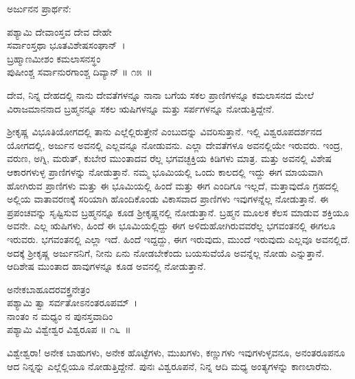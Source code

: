 ಅರ್ಜುನನ ಪ್ರಾರ್ಥನೆ:

\begin{shloka}
ಪಶ್ಯಾಮಿ ದೇವಾಂಸ್ತವ ದೇವ ದೇಹೇ\\ ಸರ್ವಾಂಸ್ತಥಾ ಭೂತವಿಶೇಷಸಂಘಾನ್~।\\ಬ್ರಹ್ಮಾಣಮೀಶಂ ಕಮಲಾಸನಸ್ಥಂ\\ ಪುಷೀಂಶ್ಚ ಸರ್ವಾನುರಗಾಂಶ್ಚ ದಿವ್ಯಾನ್ \hfill॥ ೧೫~॥
\end{shloka}

\newpage

\begin{artha}
ದೇವ, ನಿನ್ನ ದೇಹದಲ್ಲಿ ನಾನು ದೇವತೆಗಳನ್ನೂ ನಾನಾ ಬಗೆಯ ಸಕಲ ಪ್ರಾಣಿಗಳನ್ನೂ ಕಮಲಾಸನದ ಮೇಲೆ ವಿರಾಜಮಾನನಾದ ಬ್ರಹ್ಮನನ್ನೂ ಸಕಲ ಋಷಿಗಳನ್ನೂ ಮತ್ತು ಸರ್ಪಗಳನ್ನೂ ನೋಡುತ್ತಿದ್ದೇನೆ.
\end{artha}

ಶ‍್ರೀಕೃಷ್ಣ ವಿಭೂತಿಯೋಗದಲ್ಲಿ ತಾನು ಎಲ್ಲೆಲ್ಲಿರುತ್ತೇನೆ ಎಂಬುದನ್ನು ವಿವರಿಸುತ್ತಾನೆ. ಇಲ್ಲಿ ವಿಶ್ವರೂಪದರ್ಶನದ ಯೋಗದಲ್ಲಿ, ಅರ್ಜುನ ಅವನಲ್ಲಿ ಎಲ್ಲವನ್ನೂ ನೋಡುವನು. ಎಲ್ಲಾ ದೇವತೆಗಳೂ ಅವನಲ್ಲಿಯೇ ಇರುವರು. ಇಂದ್ರ, ವರುಣ, ಅಗ್ನಿ, ಮರುತ್, ಕುಬೇರ ಮುಂತಾದವ ರೆಲ್ಲ ಭಗವಚ್ಛಕ್ತಿಯ ಕಿಡಿಗಳು ಮಾತ್ರ. ಮತ್ತು ಅವನಲ್ಲಿ ವಿಶೇಷ ಆಕಾರಗಳುಳ್ಳ ಪ್ರಾಣಿಗಳನ್ನು ನೋಡುತ್ತಾನೆ. ನಮ್ಮ ಭೂಮಿಯಲ್ಲಿ ಒಂದು ಕಾಲದಲ್ಲಿ ಇದ್ದು ಈಗ ಮಾಯವಾಗಿ ಹೋಗಿರುವ ಪ್ರಾಣಿಗಳು ಮತ್ತು ಈ ಭೂಮಿಯಲ್ಲಿ ಹಿಂದೆ ಮತ್ತು ಈಗ ಎಂದಿಗೂ ಇಲ್ಲದೆ, ಮತ್ತಾವುದೊ ಗ್ರಹದಲ್ಲಿ ಅಲ್ಲಿಯ ವಾತಾವರಣಕ್ಕೆ ಸರಿಯಾಗಿ ಹೊಂದಿಕೊಂಡು ವಿಕಾಸವಾದ ಪ್ರಾಣಿಗಳು ಇವುಗಳನ್ನೆಲ್ಲ ನೋಡುತ್ತಾನೆ. ಈ ಪ್ರಪಂಚವನ್ನು ಸೃಷ್ಟಿಸುವ ಬ್ರಹ್ಮನನ್ನೂ ಕೂಡ ಶ‍್ರೀಕೃಷ್ಣನಲ್ಲಿ ನೋಡುತ್ತಾನೆ. ಬ್ರಹ್ಮನ ಮೂಲಕ ಕೆಲಸ ಮಾಡುವ ಶಕ್ತಿಯೂ ಅವನೇ. ಎಲ್ಲ ಋಷಿಗಳು, ಹಿಂದೆ ಈ ಭೂಮಿಯಲ್ಲಿದ್ದು ಈಗ ಅಳಿದುಹೋಗಿರುವವರೆಲ್ಲ ಭಗವಂತನಲ್ಲಿ ಈಗಲೂ ಇರುವರು. ಭಗವಂತನಲ್ಲಿ ಎಲ್ಲಾ ಇದೆ. ಹಿಂದೆ ಇದ್ದದ್ದು, ಈಗ ಇರುವುದು, ಮುಂದೆ ಇರುವುದು ಎಲ್ಲವೂ ಅವನಲ್ಲಿದೆ. ಅದಕ್ಕೆ ಶ‍್ರೀಕೃಷ್ಣ ಅರ್ಜುನನಿಗೆ, ನೀನು ಏನು ನೋಡಬೇಕೆಂದು ಬಯಸುವೆಯೊ ಅವನ್ನೆಲ್ಲ ನೋಡು ಎನ್ನುತ್ತಾನೆ. ಆದಿಶೇಷ ಮುಂತಾದ ಹಾವುಗಳನ್ನೂ ಕೂಡ ಅವನಲ್ಲಿ ನೋಡುತ್ತಾನೆ.

\begin{shloka}
ಅನೇಕಬಾಹೂದರವಕ್ತ್ರನೇತ್ರಂ \\ ಪಶ್ಯಾಮಿ ತ್ವಾ ಸರ್ವತೋಽನಂತರೂಪಮ್~।\\ನಾಂತಂ ನ ಮಧ್ಯಂ ನ ಪುನಸ್ತವಾದಿಂ\\ ಪಶ್ಯಾಮಿ ವಿಶ್ವೇಶ್ವರ ವಿಶ್ವರೂಪ \hfill॥ ೧೬~॥
\end{shloka}

\begin{artha}
ವಿಶ್ವೇಶ್ವರಾ! ಅನೇಕ ಬಾಹುಗಳು, ಅನೇಕ ಹೊಟ್ಟೆಗಳು, ಮುಖಗಳು, ಕಣ್ಣುಗಳು ಇವುಗಳುಳ್ಳವನೂ, ಅನಂತರೂಪನೂ ಆದ ನಿನ್ನನ್ನು ಎಲ್ಲೆಲ್ಲಿಯೂ ನೋಡುತ್ತಿದ್ದೇನೆ. ಪುನಃ ವಿಶ್ವರೂಪನೆ, ನಿನ್ನ ಆದಿ ಮಧ್ಯ ಅಂತ್ಯಗಳನ್ನು ಕಾಣಲಾರೆನು.
\end{artha}


